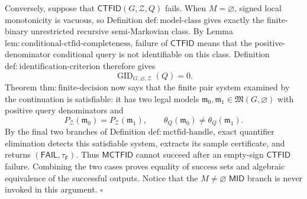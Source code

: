 Conversely, suppose that \(\mathsf{CTFID}(G,\mathcal Z,Q)\) fails.  When \(M=\varnothing\), signed local monotonicity is vacuous, so Definition \(\mathrm{def:model\text{-}class}\) gives exactly the finite-binary unrestricted recursive semi-Markovian class.  By Lemma \(\mathrm{lem:conditional\text{-}ctfid\text{-}completeness}\), failure of \(\mathsf{CTFID}\) means that the positive-denominator conditional query is not identifiable on this class.  Definition \(\mathrm{def:identification\text{-}criterion}\) therefore gives
\[
 \operatorname{GID}_{G,\varnothing,\mathcal Z}(Q)=0.
\]
Theorem \(\mathrm{thm:finite\text{-}decision}\) now says that the finite pair system examined by the continuation is satisfiable: it has two legal models \(\mathfrak m_0,\mathfrak m_1\in\mathfrak M(G,\varnothing)\) with positive query denominators and
\[
 P_{\mathcal Z}(\mathfrak m_0)=P_{\mathcal Z}(\mathfrak m_1),
 \qquad
 \theta_Q(\mathfrak m_0)\ne\theta_Q(\mathfrak m_1).
\]
By the final two branches of Definition \(\mathrm{def:mctfid\text{-}handle}\), exact quantifier elimination detects this satisfiable system, extracts its sample certificate, and returns \((\mathsf{FAIL},\tau_{\mathsf F})\).  Thus \(\mathsf{MCTFID}\) cannot succeed after an empty-sign \(\mathsf{CTFID}\) failure.  Combining the two cases proves equality of success sets and algebraic equivalence of the successful outputs.  Notice that the \(M\ne\varnothing\) \(\mathsf{MID}\) branch is never invoked in this argument. \(\square\)